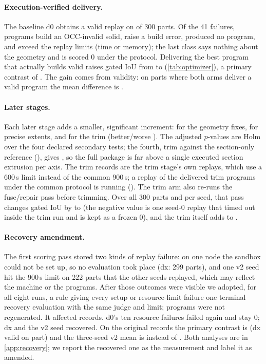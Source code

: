 \paragraph{Execution-verified delivery.} The baseline d0 obtains a valid replay on \fDZeroValid{} of 300 parts. Of the 41 failures, \fDZeroBuiltInvalid{} programs build an OCC-invalid solid, \fDZeroBuildError{} raise a build error, \fDZeroMissing{} produced no program, and \fDZeroResource{} exceed the replay limits (time or memory); the last class says nothing about the geometry and is scored 0 under the protocol. Delivering the best program that actually builds valid raises gated IoU from \hDZero{} to \hDX{} (\cref{tab:optimizer}), a primary contrast of \hDXvsDZero{} \hDXvsDZeroCI. The gain comes from validity: on parts where both arms deliver a valid program the mean difference is \hDXvsDZeroBothValid.

\paragraph{Later stages.} Each later stage adds a smaller, significant increment: \hVTwovsDX{} for the geometry fixes, \hVThreevsVTwo{} for precise extents, and \hTrimvsVThree{} for the trim (better/worse \hTrimvsVThreeWL). The adjusted $p$-values are Holm over the four declared secondary tests; the fourth, trim against the section-only reference (\hSection), gives \hTrimvsSection{} \hTrimvsSectionCI, so the full package is far above a single executed section extrusion per axis. The trim records are the trim stage's own replays, which use a 600\,s limit instead of the common 900\,s; a replay of the delivered trim programs under the common protocol is running (\hTrimCommon). The trim arm also re-runs the fuse/repair pass before trimming. Over all 300 parts and per seed, that pass changes gated IoU by \hRepassLo{} to \hRepassHi{} (the negative value is one seed-0 replay that timed out inside the trim run and is kept as a frozen 0), and the trim itself adds \hTrimProperLo{} to \hTrimProperHi.

\paragraph{Recovery amendment.} The first scoring pass stored two kinds of replay failure: on one node the sandbox could not be set up, so no evaluation took place (dx: 299 parts), and one v2 seed hit the 900\,s limit on 222 parts that the other seeds replayed, which may reflect the machine or the programs. After those outcomes were visible we adopted, for all eight runs, a rule giving every setup or resource-limit failure one terminal recovery evaluation with the same judge and limit; programs were not regenerated. It affected \hRecoveredTotal{} records. d0's ten resource failures failed again and stay 0; dx and the v2 seed recovered. On the original records the primary contrast is \hPreDXvsDZero{} (dx valid on \hPreDXValid{} part) and the three-seed v2 mean is \hPreMeanVTwox{} instead of \hMeanVTwox. Both analyses are in \cref{app:recovery}; we report the recovered one as the measurement and label it as amended.

